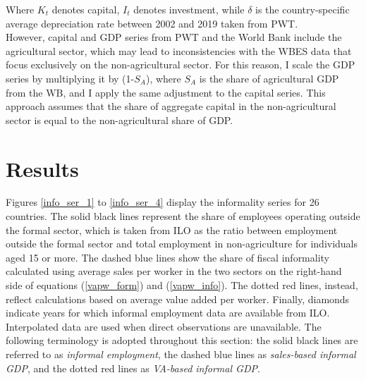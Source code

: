\documentclass[letterpaper, 12pt]{article}
\begin{document}
Where $K_{t}$ denotes capital, $I_t$ denotes investment, while $\delta$ is the country-specific average depreciation rate between 2002 and 2019 taken from PWT.
\\However, capital and GDP series from PWT and the World Bank include the agricultural sector, which may lead to inconsistencies with the WBES data that focus exclusively on the non-agricultural sector. For this reason, I scale the GDP series by multiplying it by (1-$S_A$), where $S_A$ is the share of agricultural GDP from the WB, and I apply the same adjustment to the capital series. This approach assumes that the share of aggregate capital in the non-agricultural sector is equal to the non-agricultural share of GDP.

\section{Results}\label{sec_results}
Figures \ref{info_ser_1} to \ref{info_ser_4} display the informality series for 26 countries. The solid black lines represent the share of employees operating outside the formal sector, which is taken from ILO as the ratio between employment outside the formal sector and total employment in non-agriculture for individuals aged 15 or more. The dashed blue lines show the share of fiscal informality calculated using average sales per worker in the two sectors on the right-hand side of equations (\ref{vapw_form}) and (\ref{vapw_info}). The dotted red lines, instead, reflect calculations based on average value added per worker. Finally, diamonds indicate years for which informal employment data are available from ILO. Interpolated data are used when direct observations are unavailable. The following terminology is adopted throughout this section: the solid black lines are referred to as \textit{informal employment}, the dashed blue lines as \textit{sales-based informal GDP}, and the dotted red lines as \textit{VA-based informal GDP}.
\end{document}
